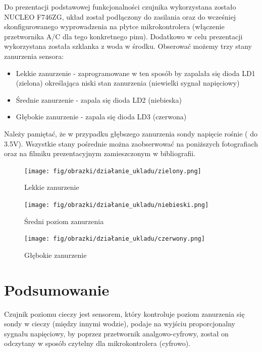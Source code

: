 \documentclass[11pt, a4paper]{article}
\begin{document}
Do prezentacji podstawowej funkcjonalności czujnika wykorzystana zostało NUCLEO F746ZG, układ został podłączony do zasilania oraz do wcześniej skonfigurowanego wyprowadzenia na płytce mikrokontrolera (włączenie przetwornika A/C dla tego konkretnego pinu). Dodatkowo w celu prezentacji wykorzystana została szklanka z woda w środku. Obserować możemy trzy stany zanurzenia sensora:
\begin{itemize}
    \item Lekkie zanurzenie - zaprogramowane w ten sposób by zapalała się dioda  LD1 (zielona) określająca niski stan zanurzenia (niewielki sygnał napięciowy)
    \item Średnie zanurzenie - zapala się dioda LD2 (niebieska)
    \item Głębokie zanurzenie - zapala się dioda LD3 (czerwona)
\end{itemize}

Należy pamiętać, że w przypadku głębszego zanurzenia sondy napięcie rośnie ( do 3.5V).
Wszystkie stany pośrednie można zaobserwować na poniższych fotografiach oraz na filmiku prezentacyjnym zamieszczonym w bibliografii.


\vspace{0.5cm}
\begin{figure}[h!]
    \centering
    \texttt{[image: fig/obrazki/działanie\_ukladu/zielony.png]}
    \caption{Lekkie zanurzenie}
    \label{fig:my_label}
\end{figure}
\vspace{0.5cm}



\vspace{0.5cm}
\begin{figure}[h!]
    \centering
    \texttt{[image: fig/obrazki/działanie\_ukladu/niebieski.png]}
    \caption{Średni poziom zanurzenia}
    \label{fig:my_label}
\end{figure}
\vspace{0.5cm}



\vspace{0.5cm}
\begin{figure}[h!]
    \centering
    \texttt{[image: fig/obrazki/działanie\_ukladu/czerwony.png]}
    \caption{Głębokie zanurzenie}
    \label{fig:my_label}
\end{figure}
\vspace{0.5cm}





\section*{Podsumowanie} 
Czujnik poziomu cieczy jest sensorem, który kontroluje poziom zanurzenia się sondy w cieczy (między innymi wodzie), podaje na wyjściu proporcjonalny sygnału napięciowy, by poprzez przetwornik analgowo-cyfrowy, został on odczytany w sposób czytelny dla mikrokontrolera (cyfrowo).
\printbibliography[heading=bibintoc]
\end{document}
